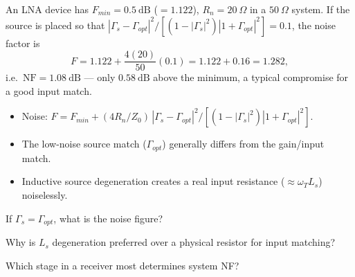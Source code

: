 \begin{workedexample}
An LNA device has $F_{min} = 0.5\ \text{dB}$ ($=1.122$), $R_n = 20\ \Omega$
in a $50\ \Omega$ system. If the source is placed so that
$|\Gamma_s-\Gamma_{opt}|^2/[(1-|\Gamma_s|^2)|1+\Gamma_{opt}|^2] = 0.1$, the noise
factor is
\[ F = 1.122 + \frac{4(20)}{50}(0.1) = 1.122 + 0.16 = 1.282, \]
i.e.\ $\text{NF} = 1.08\ \text{dB}$ --- only $0.58\ \text{dB}$ above the minimum, a
typical compromise for a good input match.
\end{workedexample}

\begin{keytakeaways}
\begin{itemize}[leftmargin=1.4em,itemsep=2pt]
\item Noise: $F = F_{min} + (4R_n/Z_0)\,|\Gamma_s-\Gamma_{opt}|^2/[(1-|\Gamma_s|^2)|1+\Gamma_{opt}|^2]$.
\item The low-noise source match ($\Gamma_{opt}$) generally differs from the gain/input match.
\item Inductive source degeneration creates a real input resistance ($\approx\omega_T L_s$) noiselessly.
\end{itemize}
\end{keytakeaways}

\begin{exercises}
\item If $\Gamma_s = \Gamma_{opt}$, what is the noise figure?
\item Why is $L_s$ degeneration preferred over a physical resistor for input matching?
\item Which stage in a receiver most determines system NF?
\end{exercises}

